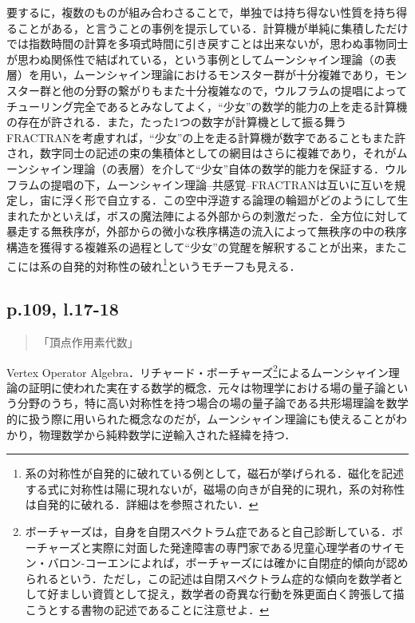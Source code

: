 \documentclass[10pt, a5paper, twoside]{jsarticle}
\theoremstyle{definition}
\begin{document}
			要するに，複数のものが組み合わさることで，単独では持ち得ない性質を持ち得ることがある，と言うことの事例を提示している．計算機が単純に集積しただけでは指数時間の計算を多項式時間に引き戻すことは出来ないが，思わぬ事物同士が思わぬ関係性で結ばれている，という事例としてムーンシャイン理論（の表層）を用い，ムーンシャイン理論におけるモンスター群が十分複雑であり，モンスター群と他の分野の繋がりもまた十分複雑なので，ウルフラムの提唱によってチューリング完全であるとみなしてよく，“少女”の数学的能力の上を走る計算機の存在が許される．また，たった1つの数字が計算機として振る舞うFRACTRANを考慮すれば，“少女”の上を走る計算機が数字であることもまた許され，数字同士の記述の束の集積体としての網目はさらに複雑であり，それがムーンシャイン理論（の表層）を介して“少女”自体の数学的能力を保証する．ウルフラムの提唱の下，ムーンシャイン理論--共感覚--FRACTRANは互いに互いを規定し，宙に浮く形で自立する．この空中浮遊する論理の輪廻がどのようにして生まれたかといえば，ボスの魔法陣による外部からの刺激だった．全方位に対して暴走する無秩序が，外部からの微小な秩序構造の流入によって無秩序の中の秩序構造を獲得する複雑系の過程として“少女”の覚醒を解釈することが出来，またここには系の自発的対称性の破れ\footnote{系の対称性が自発的に破れている例として，磁石が挙げられる．磁化を記述する式に対称性は陽に現れないが，磁場の向きが自発的に現れ，系の対称性は自発的に破れる．詳細は\cite{tsk}を参照されたい．}というモチーフも見える．

		\subsection{p.109, l.17-18}

			\begin{quote}

				「頂点作用素代数」
				
			\end{quote}

			Vertex Operator Algebra．リチャード・ボーチャーズ\footnote{ボーチャーズは，自身を自閉スペクトラム症であると自己診断している．ボーチャーズと実際に対面した発達障害の専門家である児童心理学者のサイモン・バロン-コーエンによれば，ボーチャーズには確かに自閉症的傾向が認められるという\cite{sym}．ただし，この記述は自閉スペクトラム症的な傾向を数学者として好ましい資質として捉え，数学者の奇異な行動を殊更面白く誇張して描こうとする書物の記述であることに注意せよ．}によるムーンシャイン理論の証明に使われた実在する数学的概念\cite{miya}．元々は物理学における場の量子論という分野のうち，特に高い対称性を持つ場合の場の量子論である共形場理論を数学的に扱う際に用いられた概念なのだが，ムーンシャイン理論にも使えることがわかり，物理数学から純粋数学に逆輸入された経緯を持つ．
\end{document}

